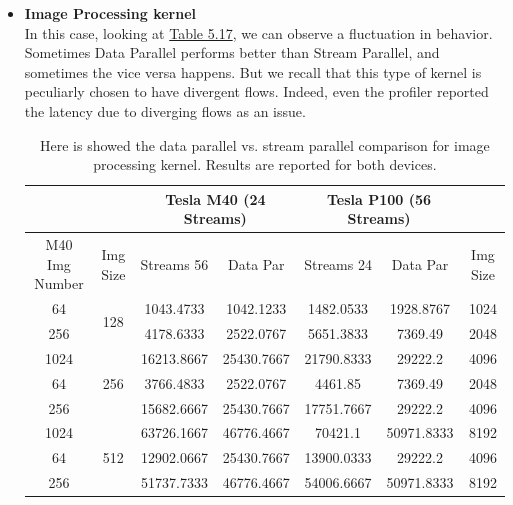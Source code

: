 \begin{itemize}
	
	\item \textbf{Image Processing kernel}\\
	In this case, looking at \hyperref[tab:imgdataparVSsm]{Table 5.17}, we can observe a fluctuation in behavior.\\
	Sometimes Data Parallel performs better than Stream Parallel, and sometimes the vice versa happens. But we recall that this type of kernel is peculiarly chosen to have divergent flows. Indeed, even the profiler reported the latency due to diverging flows as an issue.
	\begin{table}
		\centering
		\begin{tabular}{ | c  c || c | c  || c | c || c|| } 
			\hline
			& &  \multicolumn{2}{c}{\textbf{Tesla M40 (24 Streams)}}& \multicolumn{2}{c}{\textbf{Tesla P100 (56 Streams)}}& \\ [0.5ex]
			\hline							M40	
			Img Number&	Img Size&	Streams 56&	Data Par&	Streams 24&	Data Par	& Img Size\\
			\hline	\hline	
			64&	\multirow{2}{*}{128}&	1043.4733&	1042.1233&	1482.0533&	1928.8767&	1024\\
			256	& &	4178.6333&	2522.0767&	5651.3833&	7369.49&	2048\\
			1024& &	16213.8667&	25430.7667&	21790.8333&	29222.2&	4096\\
			\hline	
			64&	\multirow{1}{*}{256} & 3766.4833 & 2522.0767 & 4461.85&	7369.49&	2048\\
			256	& &	15682.6667&	25430.7667&	17751.7667&	29222.2&	4096\\
			1024 & & 63726.1667&	46776.4667&	70421.1&	50971.8333&	8192\\
			\hline	
			64&	\multirow{1}{*}{512} & 12902.0667 & 25430.7667&	13900.0333 & 29222.2 & 4096\\
			256& &	51737.7333&	46776.4667&	54006.6667&	50971.8333&	8192\\
			
		\hline			
		\end{tabular}
		\caption{Here is showed the data parallel vs. stream parallel comparison for image processing kernel. Results are reported for both devices.}	
		\label{tab:imgdataparVSsm}		
	\end{table}
	
	
\end{itemize}


